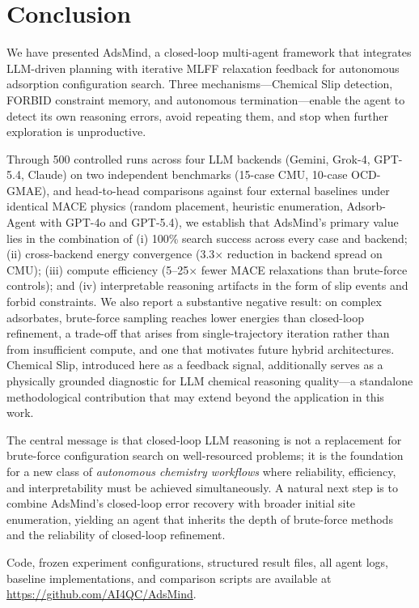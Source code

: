 \section{Conclusion}

We have presented AdsMind, a closed-loop multi-agent framework that integrates LLM-driven planning with iterative MLFF relaxation feedback for autonomous adsorption configuration search.
Three mechanisms---Chemical Slip detection, FORBID constraint memory, and autonomous termination---enable the agent to detect its own reasoning errors, avoid repeating them, and stop when further exploration is unproductive.

Through 500 controlled runs across four LLM backends (Gemini, Grok-4, GPT-5.4, Claude) on two independent benchmarks (15-case CMU, 10-case OCD-GMAE), and head-to-head comparisons against four external baselines under identical MACE physics (random placement, heuristic enumeration, Adsorb-Agent with GPT-4o and GPT-5.4), we establish that AdsMind's primary value lies in the combination of (i) 100\% search success across every case and backend; (ii) cross-backend energy convergence (3.3$\times$ reduction in backend spread on CMU); (iii) compute efficiency (5--25$\times$ fewer MACE relaxations than brute-force controls); and (iv) interpretable reasoning artifacts in the form of slip events and forbid constraints.
We also report a substantive negative result: on complex adsorbates, brute-force sampling reaches lower energies than closed-loop refinement, a trade-off that arises from single-trajectory iteration rather than from insufficient compute, and one that motivates future hybrid architectures.
Chemical Slip, introduced here as a feedback signal, additionally serves as a physically grounded diagnostic for LLM chemical reasoning quality---a standalone methodological contribution that may extend beyond the application in this work.

The central message is that closed-loop LLM reasoning is not a replacement for brute-force configuration search on well-resourced problems; it is the foundation for a new class of \textit{autonomous chemistry workflows} where reliability, efficiency, and interpretability must be achieved simultaneously.
A natural next step is to combine AdsMind's closed-loop error recovery with broader initial site enumeration, yielding an agent that inherits the depth of brute-force methods and the reliability of closed-loop refinement.

Code, frozen experiment configurations, structured result files, all agent logs, baseline implementations, and comparison scripts are available at \url{https://github.com/AI4QC/AdsMind}.
